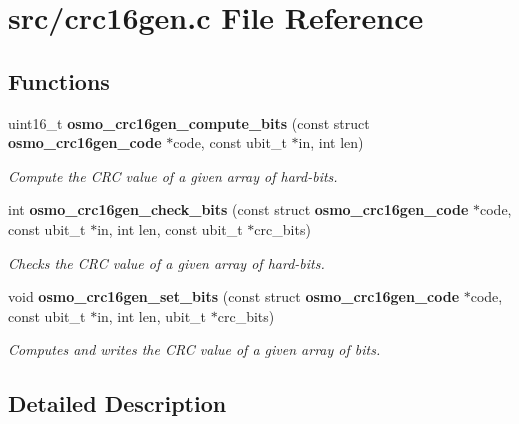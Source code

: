 \section{src/crc16gen.c File Reference}
\label{crc16gen_8c}
\subsection*{Functions}
\begin{DoxyCompactItemize}
\item 
uint16\_\-t {\bf osmo\_\-crc16gen\_\-compute\_\-bits} (const struct {\bf osmo\_\-crc16gen\_\-code} $\ast$code, const ubit\_\-t $\ast$in, int len)
\begin{DoxyCompactList}\small\item\em Compute the CRC value of a given array of hard-\/bits. \item\end{DoxyCompactList}\item 
int {\bf osmo\_\-crc16gen\_\-check\_\-bits} (const struct {\bf osmo\_\-crc16gen\_\-code} $\ast$code, const ubit\_\-t $\ast$in, int len, const ubit\_\-t $\ast$crc\_\-bits)
\begin{DoxyCompactList}\small\item\em Checks the CRC value of a given array of hard-\/bits. \item\end{DoxyCompactList}\item 
void {\bf osmo\_\-crc16gen\_\-set\_\-bits} (const struct {\bf osmo\_\-crc16gen\_\-code} $\ast$code, const ubit\_\-t $\ast$in, int len, ubit\_\-t $\ast$crc\_\-bits)
\begin{DoxyCompactList}\small\item\em Computes and writes the CRC value of a given array of bits. \item\end{DoxyCompactList}\end{DoxyCompactItemize}


\subsection{Detailed Description}
